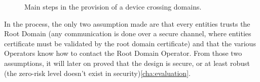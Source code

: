 \begin{figure}[!ht]
	\centering
	\qquad
	\caption{Main steps in the provision of a device crossing domains.}
	\label{fig:example}
\end{figure}

\vspace{1em}
In the process, the only two assumption made are that every entities trusts the Root Domain (any communication is done over a secure channel, where entities certificate must be validated by the root domain certificate) and that the various Operators know how to contact the Root Domain Operator. From those two assumptions, it will later on proved that the design is secure, or at least robust (the zero-risk level doesn't exist in security)\ref{cha:evaluation}.

